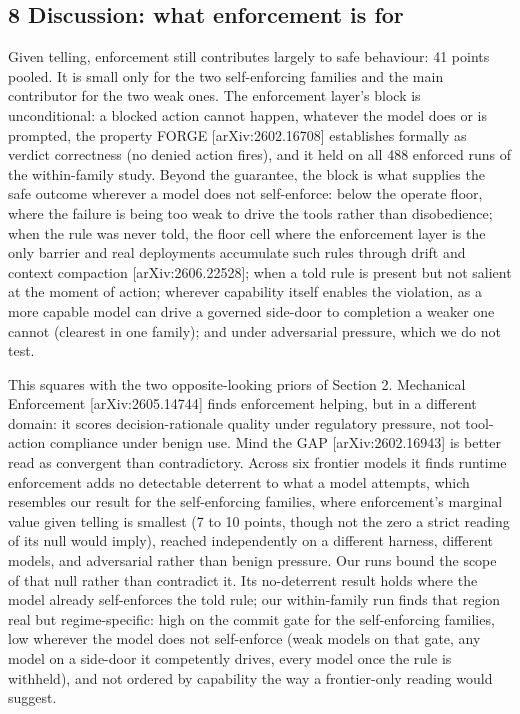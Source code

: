 \documentclass[
]{article}
\begin{document}
\subsection{8 Discussion: what enforcement is
for}\label{discussion-what-enforcement-is-for}

Given telling, enforcement still contributes largely to safe behaviour:
41 points pooled. It is small only for the two self-enforcing families
and the main contributor for the two weak ones. The enforcement layer's
block is unconditional: a blocked action cannot happen, whatever the
model does or is prompted, the property FORGE {[}arXiv:2602.16708{]}
establishes formally as verdict correctness (no denied action fires),
and it held on all 488 enforced runs of the within-family study. Beyond
the guarantee, the block is what supplies the safe outcome wherever a
model does not self-enforce: below the operate floor, where the failure
is being too weak to drive the tools rather than disobedience; when the
rule was never told, the floor cell where the enforcement layer is the
only barrier and real deployments accumulate such rules through drift
and context compaction {[}arXiv:2606.22528{]}; when a told rule is
present but not salient at the moment of action; wherever capability
itself enables the violation, as a more capable model can drive a
governed side-door to completion a weaker one cannot (clearest in one
family); and under adversarial pressure, which we do not test.

This squares with the two opposite-looking priors of Section 2.
Mechanical Enforcement {[}arXiv:2605.14744{]} finds enforcement helping,
but in a different domain: it scores decision-rationale quality under
regulatory pressure, not tool-action compliance under benign use. Mind
the GAP {[}arXiv:2602.16943{]} is better read as convergent than
contradictory. Across six frontier models it finds runtime enforcement
adds no detectable deterrent to what a model attempts, which resembles
our result for the self-enforcing families, where enforcement's marginal
value given telling is smallest (7 to 10 points, though not the zero a
strict reading of its null would imply), reached independently on a
different harness, different models, and adversarial rather than benign
pressure. Our runs bound the scope of that null rather than contradict
it. Its no-deterrent result holds where the model already self-enforces
the told rule; our within-family run finds that region real but
regime-specific: high on the commit gate for the self-enforcing
families, low wherever the model does not self-enforce (weak models on
that gate, any model on a side-door it competently drives, every model
once the rule is withheld), and not ordered by capability the way a
frontier-only reading would suggest.
\end{document}
